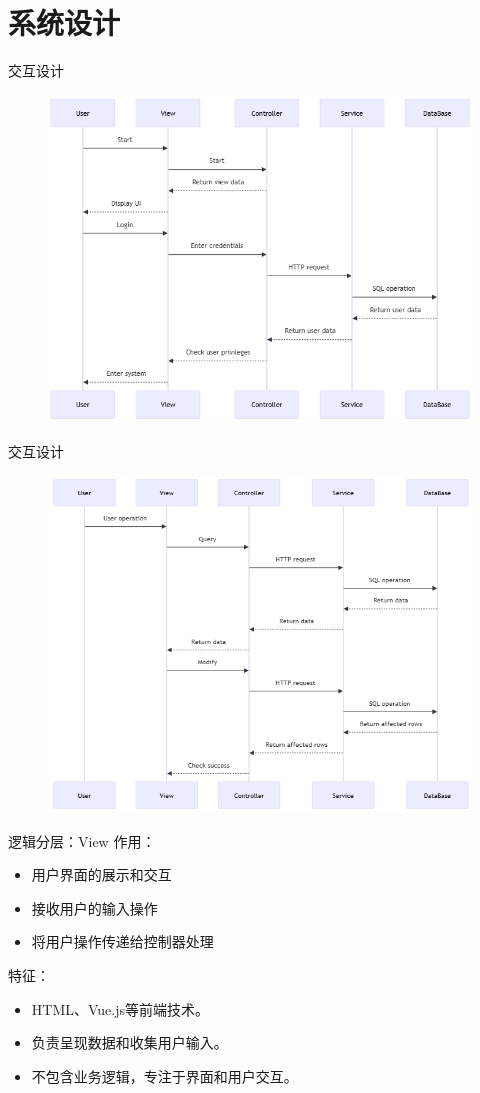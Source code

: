 \documentclass{beamer}
\begin{document}
\section{系统设计}
\begin{frame}{交互设计}
    \begin{figure}
        \centering
        \includegraphics[width=0.7\linewidth]{sequence diagram (1).png}
    \end{figure}
\end{frame}
\begin{frame}{交互设计}
    \begin{figure}
        \centering
        \includegraphics[width=0.7\linewidth]{sequence diagram (2).png}
    \end{figure}
\end{frame}
\begin{frame}{逻辑分层：View}
作用：
    \begin{itemize}
    \item 用户界面的展示和交互
    \item 接收用户的输入操作
    \item 将用户操作传递给控制器处理
    \end{itemize}
特征：
    \begin{itemize}
    \item HTML、Vue.js等前端技术。
    \item 负责呈现数据和收集用户输入。
    \item 不包含业务逻辑，专注于界面和用户交互。
    \end{itemize}
\end{frame}
\end{document}
